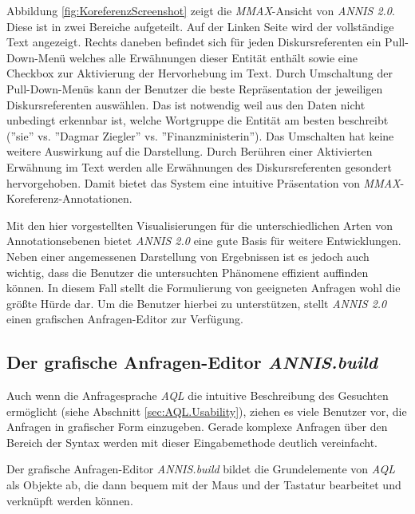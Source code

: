 Abbildung \ref{fig:KoreferenzScreenshot} zeigt die \emph{MMAX}-Ansicht von \emph{ANNIS 2.0}. Diese ist in zwei Bereiche aufgeteilt. Auf der Linken Seite wird der vollständige Text angezeigt. Rechts daneben befindet sich für jeden Diskursreferenten ein Pull-Down-Menü welches alle Erwähnungen dieser Entität enthält sowie eine Checkbox zur Aktivierung der Hervorhebung im Text. Durch Umschaltung der Pull-Down-Menüs kann der Benutzer die beste Repräsentation der jeweiligen Diskursreferenten auswählen. Das ist notwendig weil aus den Daten nicht unbedingt erkennbar ist, welche Wortgruppe die Entität am besten beschreibt (''sie'' vs. ''Dagmar Ziegler'' vs. ''Finanzministerin''). Das Umschalten hat keine weitere Auswirkung auf die Darstellung. Durch Berühren einer Aktivierten Erwähnung im Text werden alle Erwähnungen des Diskursreferenten gesondert hervorgehoben. Damit bietet das System eine intuitive Präsentation von \emph{MMAX}-Koreferenz-Annotationen.

Mit den hier vorgestellten Visualisierungen für die unterschiedlichen Arten von Annotationsebenen bietet \emph{ANNIS 2.0} eine gute Basis für weitere Entwicklungen. Neben einer angemessenen Darstellung von Ergebnissen ist es jedoch auch wichtig, dass die Benutzer die untersuchten Phänomene effizient auffinden können. In diesem Fall stellt die Formulierung von geeigneten Anfragen wohl die größte Hürde dar. Um die Benutzer hierbei zu unterstützen, stellt \emph{ANNIS 2.0} einen grafischen Anfragen-Editor zur Verfügung.

\subsection{Der grafische Anfragen-Editor \emph{ANNIS.build}}\label{sec:ANNIS.build}

Auch wenn die Anfragesprache \emph{AQL} die intuitive Beschreibung des Gesuchten ermöglicht (siehe Abschnitt \ref{sec:AQL.Usability}), ziehen es viele Benutzer vor, die Anfragen in grafischer Form einzugeben. Gerade komplexe Anfragen über den Bereich der Syntax werden mit dieser Eingabemethode deutlich vereinfacht.

Der grafische Anfragen-Editor \emph{ANNIS.build} bildet die Grundelemente von \emph{AQL} als Objekte ab, die dann bequem mit der Maus und der Tastatur bearbeitet und verknüpft werden können.

